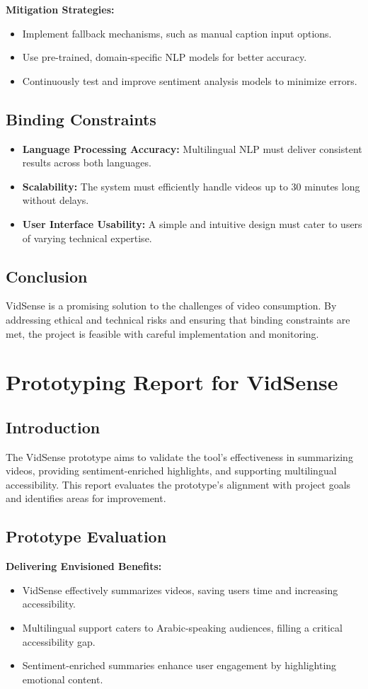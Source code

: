 \documentclass{bscs}
\begin{document}
\textbf{Mitigation Strategies:}
\begin{itemize}
    \item Implement fallback mechanisms, such as manual caption input options.
    \item Use pre-trained, domain-specific NLP models for better accuracy.
    \item Continuously test and improve sentiment analysis models to minimize errors.
\end{itemize}

\subsection{Binding Constraints}
\begin{itemize}
    \item \textbf{Language Processing Accuracy:} Multilingual NLP must deliver consistent results across both languages.
    \item \textbf{Scalability:} The system must efficiently handle videos up to 30 minutes long without delays.
    \item \textbf{User Interface Usability:} A simple and intuitive design must cater to users of varying technical expertise.
\end{itemize}

\subsection{Conclusion}
VidSense is a promising solution to the challenges of video consumption. By addressing ethical and technical risks and ensuring that binding constraints are met, the project is feasible with careful implementation and monitoring.

\section{Prototyping Report for VidSense}
\subsection{Introduction}
The VidSense prototype aims to validate the tool's effectiveness in summarizing videos, providing sentiment-enriched highlights, and supporting multilingual accessibility. This report evaluates the prototype's alignment with project goals and identifies areas for improvement.

\subsection{Prototype Evaluation}
\textbf{Delivering Envisioned Benefits:}
\begin{itemize}
    \item VidSense effectively summarizes videos, saving users time and increasing accessibility.
    \item Multilingual support caters to Arabic-speaking audiences, filling a critical accessibility gap.
    \item Sentiment-enriched summaries enhance user engagement by highlighting emotional content.
\end{itemize}
\end{document}
